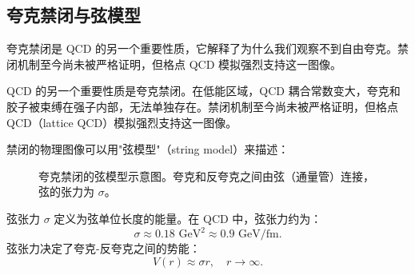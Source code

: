 \subsection{夸克禁闭与弦模型}

夸克禁闭是 QCD 的另一个重要性质，它解释了为什么我们观察不到自由夸克。禁闭机制至今尚未被严格证明，但格点 QCD 模拟强烈支持这一图像。

\begin{property}[夸克禁闭]
QCD 的另一个重要性质是夸克禁闭。在低能区域，QCD 耦合常数变大，夸克和胶子被束缚在强子内部，无法单独存在。禁闭机制至今尚未被严格证明，但格点 QCD（lattice QCD）模拟强烈支持这一图像。
\end{property}

禁闭的物理图像可以用"弦模型"（string model）来描述：

\begin{figure}[htbp]
\centering
{}
\caption{夸克禁闭的弦模型示意图。夸克和反夸克之间由弦（通量管）连接，弦的张力为 $\sigma$。}
\label{fig:confinement_string}
\end{figure}

\begin{definition}[弦张力]
弦张力 $\sigma$ 定义为弦单位长度的能量。在 QCD 中，弦张力约为：
\begin{equation}
    \sigma \approx 0.18 \text{ GeV}^2 \approx 0.9 \text{ GeV/fm}.
\end{equation}
弦张力决定了夸克-反夸克之间的势能：
\begin{equation}
    V(r) \approx \sigma r, \quad r \to \infty.
\end{equation}
\end{definition}

